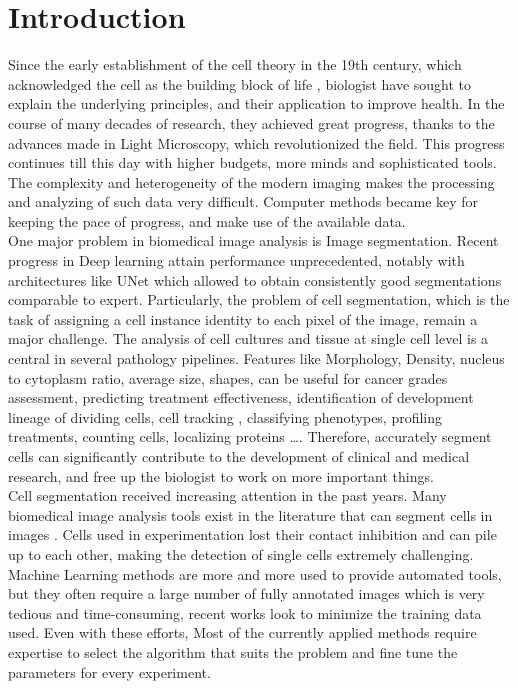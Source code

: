 \documentclass[main.tex]{subfiles}
\begin{document}
\chapter{Introduction}

Since the early establishment of the cell theory in the 19th century, which acknowledged the cell as the building block of life \cite{Muller-Wille2010}, biologist have sought to explain the underlying principles, and their application to improve health. In the course of many decades of research, they achieved great progress, thanks to the advances made in Light Microscopy, which revolutionized the field. This progress continues till this day with higher budgets, more minds and sophisticated tools. The complexity and heterogeneity of the modern imaging makes the processing and analyzing of such data very difficult. Computer methods became key for keeping the pace of progress, and make use of the available data.\\

One major problem in biomedical image analysis is Image segmentation. Recent progress in Deep learning attain performance unprecedented, notably with architectures like UNet\cite{Ronneberger2015} which allowed to obtain consistently good segmentations comparable to expert. Particularly, the problem of cell segmentation, which is the task of assigning a cell instance identity to each pixel of the image, remain a major challenge. The analysis of cell cultures and tissue at single cell level is a central in several pathology pipelines\cite{Boquet-Pujadas2021}. Features like Morphology, Density, nucleus to cytoplasm ratio, average size, shapes, can be useful for cancer grades assessment, predicting treatment effectiveness, identification of development lineage of dividing cells, cell tracking \cite{Boquet-Pujadas2021}, classifying phenotypes, profiling treatments, counting cells, localizing proteins \dots. Therefore, accurately segment cells can significantly contribute to the development of clinical and medical research, and free up the biologist to work on more important things.\\


Cell segmentation received increasing attention in the past years. Many biomedical image analysis tools exist in the literature that can segment cells in images \cite{Boquet-Pujadas2021}. Cells used in experimentation lost their contact inhibition and can pile up to each other, making the detection of single cells extremely challenging. Machine Learning methods are more and more used to provide automated tools, but they often require a large number of fully annotated images which is very tedious and time-consuming, recent works look to minimize the training data used. Even with these efforts, Most of the currently applied methods require expertise to select the algorithm that suits the problem and fine tune the parameters for every experiment.\\
\end{document}
